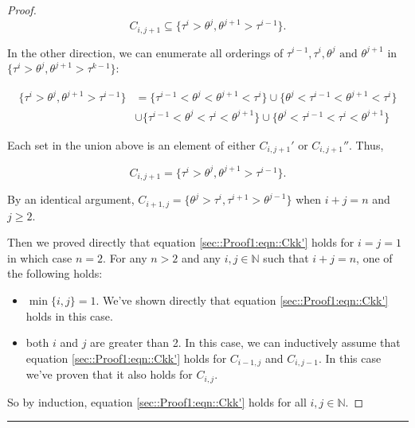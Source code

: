\documentclass[12pt]{article}
\newcommand{\mb}{\mathbb}
\newcommand{\te}{\text}
\newcommand{\lin}{\rule{\linewidth}{0.4 pt}}
\newcommand{\rt}[1]{\tau^{#1}}						%
\newcommand{\rtt}[1]{\theta^{#1}}					%
\renewcommand{\it}{k}								%
\newcommand{\itt}{i}								%
\newcommand{\ittt}{j}								%
\newcommand{\pathsete}[2]{C_{#1,#2}}			%
\begin{document}
\begin{proof}
\[\pathsete{\itt}{\ittt+1} \subseteq \{\rt{\itt} > \rtt{\ittt},\rtt{\ittt+1} > \rt{\itt-1}\}.\]

In the other direction, we can enumerate all orderings of \(\rt{\itt-1},\rt{\itt},\rtt{\ittt}\te{ and } \rtt{\ittt+1}\) in \(\{\rt{\itt} > \rtt{\ittt}, \rtt{\ittt+1} > \rt{\it-1}\}\):

\begin{align*}
\{\rt{\itt} > \rtt{\ittt},\rtt{\ittt+1} > \rt{\itt-1}\} &= \{\rt{\itt-1} < \rtt{\ittt} < \rtt{\ittt+1} < \rt{\itt}\} \cup \{\rtt{\ittt} < \rt{\itt-1} < \rtt{\ittt+1} < \rt{\itt}\}\\
&\cup \{\rt{\itt-1} < \rtt{\ittt} < \rt{\itt} < \rtt{\ittt+1}\} \cup \{\rtt{\ittt} < \rt{\itt-1} <\rt{\itt} < \rtt{\ittt+1}\}
\end{align*}

Each set in the union above is an element of either \(\pathsete{\itt}{\ittt+1}'\) or \(\pathsete{\itt}{\ittt+1}''\). Thus,

\[\pathsete{\itt}{\ittt+1} = \{\rt{\itt} > \rtt{\ittt},\rtt{\ittt+1} > \rt{\itt-1}\}.\]

By an identical argument, \(\pathsete{\itt+1}{\ittt} = \{\rtt{\ittt} > \rt{\itt},\rt{\itt+1} > \rtt{\ittt-1}\}\) when \(\itt + \ittt = n\) and \(\ittt \geq 2\).

Then we proved directly that equation \eqref{sec::Proof1:eqn::Ckk'} holds for \(\itt = \ittt=1\) in which case \(n = 2\). For any \(n > 2\) and any \(\itt,\ittt\in \mb{N}\) such that \(\itt + \ittt = n\), one of the following holds:

\begin{itemize}
\item \(\min\{\itt,\ittt\} = 1\). We've shown directly that equation \eqref{sec::Proof1:eqn::Ckk'} holds in this case.

\item both \(\itt\) and \(\ittt\) are greater than 2. In this case, we can inductively assume that equation \eqref{sec::Proof1:eqn::Ckk'} holds for \(\pathsete{\itt-1}{\ittt}\) and \(\pathsete{\itt}{\ittt-1}\). In this case we've proven that it also holds for \(\pathsete{\itt}{\ittt}\).
\end{itemize}

So by induction, equation \eqref{sec::Proof1:eqn::Ckk'} holds for all \(\itt,\ittt\in \mb{N}\).
\end{proof}

\lin
\end{document}
